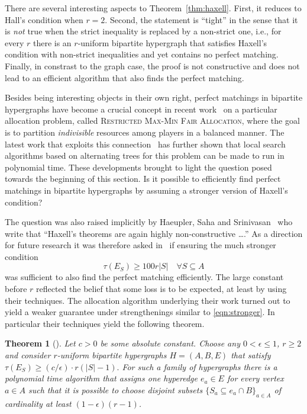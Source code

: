\documentclass[11pt]{article}
\newtheorem{theorem}{Theorem}[section]
\theoremstyle{definition}
\theoremstyle{remark}
\newcommand{\problemmacro}[1]{\texorpdfstring{\textsc{#1}}{#1}\xspace}
\begin{document}
There are several interesting aspects to
Theorem~\ref{thm:haxell}. First, it reduces to Hall's condition when
$r=2$. Second, the statement is ``tight'' in the sense that it is
\emph{not} true when the strict inequality is replaced by a non-strict
one, i.e., for every $r$ there is an $r$-uniform bipartite hypergraph
that satisfies Haxell's condition with non-strict inequalities and yet
contains no perfect matching. Finally, in constrast to the graph case,
the proof is not constructive and does not lead to an efficient
algorithm that also finds the perfect matching.

Besides being interesting objects in their own right, perfect
matchings in bipartite hypergraphs have become a crucial concept in
recent
work~\cite{bansal2006santa,feige2008allocations,haeupler2011new,asadpour2012santa,svensson2012santa,polacek2012quasi,DBLP:conf/soda/AnnamalaiKS15}
on a particular allocation problem, called \problemmacro{Restricted
  Max-Min Fair Allocation}, where the goal is to partition
\emph{indivisible} resources among players in a balanced manner. The
latest work that exploits this
connection~\cite{DBLP:conf/soda/AnnamalaiKS15} has further shown that
local search algorithms based on alternating trees for this problem
can be made to run in polynomial time. These developments brought to
light the question posed towards the beginning of this section. Is it
possible to efficiently find perfect matchings in bipartite
hypergraphs by assuming a stronger version of Haxell's condition?

The question was also raised implicitly by Haeupler, Saha and
Srinivasan~\cite{haeupler2011new} who write that ``Haxell's theorems
are again highly non-constructive \ldots.'' As a direction for future
research it was therefore asked in~\cite{DBLP:conf/soda/AnnamalaiKS15} if
ensuring the much stronger condition
\begin{equation}\label{eqn:stronger}
\tau(E_S) \geq 100r|S| \quad \forall S \subseteq A
\end{equation}
was sufficient to also find the perfect matching efficiently. The
large constant before $r$ reflected the belief that some loss is to be
expected, at least by using their techniques. The allocation algorithm
underlying their work turned out to yield a weaker guarantee under
strengthenings similar to \eqref{eqn:stronger}. In particular
their techniques yield the following theorem.

\begin{theorem}[\cite{DBLP:conf/soda/AnnamalaiKS15}]\label{thm:weak}
  Let $c > 0$ be some absolute constant. Choose any
  $0 < \epsilon \leq 1$, $r \geq 2$ and consider $r$-uniform bipartite
  hypergraphs $H=(A,B,E)$ that satisfy
  $\tau(E_S) \geq (c/\epsilon) \cdot r(|S|-1).$ For such a family of
  hypergraphs there is a polynomial time algorithm that assigns one
  hyperedge $e_a \in E$ for every vertex $a \in A$ such that it is
  possible to choose disjoint subsets
  $\{S_a \subseteq e_a \cap B\}_{a\in A}$ of cardinality at least
  $(1-\epsilon)(r-1)$.
\end{theorem}
\end{document}
